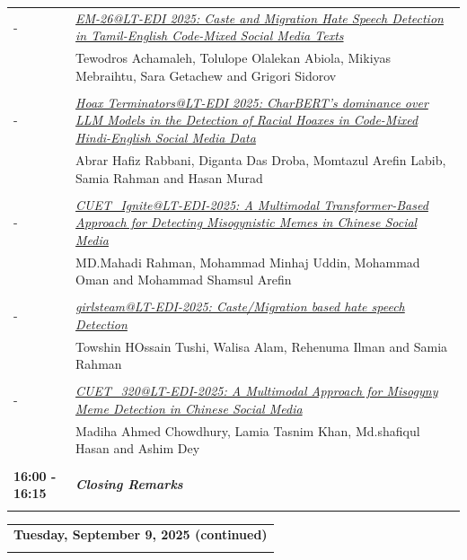 \documentclass[11pt,oneside]{book}
\begin{document}
\begin{tabular}{p{24mm}p{124mm}}
                       -  & \hyperlink{page.152}{\emph{EM-26@LT-EDI 2025: Caste and Migration Hate Speech Detection in Tamil-English Code-Mixed Social Media Texts}}\\
        & Tewodros Achamaleh\index{Achamaleh}, Tolulope Olalekan Abiola\index{Abiola}, Mikiyas Mebraihtu\index{Mebraihtu}, Sara Getachew\index{Getachew} and Grigori Sidorov\index{Sidorov}\\\\
                
                       -  & \hyperlink{page.159}{\emph{Hoax Terminators@LT-EDI 2025: CharBERT's dominance over LLM Models in the Detection of Racial Hoaxes in Code-Mixed Hindi-English Social Media Data}}\\
        & Abrar Hafiz Rabbani\index{Rabbani}, Diganta Das Droba\index{Droba}, Momtazul Arefin Labib\index{Labib}, Samia Rahman\index{Rahman} and Hasan Murad\index{Murad}\\\\
                
                       -  & \hyperlink{page.171}{\emph{CUET\_Ignite@LT-EDI-2025: A Multimodal Transformer-Based Approach for Detecting Misogynistic Memes in Chinese Social Media}}\\
        & MD.Mahadi Rahman\index{Rahman}, Mohammad Minhaj Uddin\index{Uddin}, Mohammad Oman\index{Oman} and Mohammad Shamsul Arefin\index{Arefin}\\\\
                
                       -  & \hyperlink{page.177}{\emph{girlsteam@LT-EDI-2025: Caste/Migration based hate speech Detection}}\\
        & Towshin HOssain Tushi\index{Tushi}, Walisa Alam\index{Alam}, Rehenuma Ilman\index{Ilman} and Samia Rahman\index{Rahman}\\\\
                
                       -  & \hyperlink{page.183}{\emph{CUET\_320@LT-EDI-2025: A Multimodal Approach for Misogyny Meme Detection in Chinese Social Media}}\\
        & Madiha Ahmed Chowdhury\index{Chowdhury}, Lamia Tasnim Khan\index{Khan}, Md.shafiqul Hasan\index{Hasan} and Ashim Dey\index{Dey}\\\\
                      \textbf{16:00 - 16:15} & \emph{\textbf{Closing Remarks}}\\\\
      
              \end{tabular}
    \newpage
          \begin{tabular}{p{24mm}p{124mm}}
    \multicolumn{2}{l}{\bf Tuesday, September 9, 2025 (continued)} \\\\
        \end{tabular}
    \newpage
\end{document}
